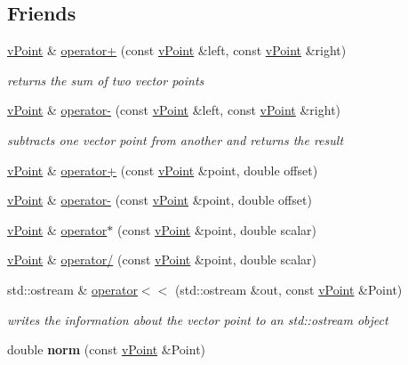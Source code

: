 \subsection*{Friends}
\begin{DoxyCompactItemize}
\item 
\mbox{\label{classv_point_a1c4599f190a262e247ba7c3593b4cfe5}} 
\hyperlink{classv_point}{v\+Point} \& \hyperlink{classv_point_a1c4599f190a262e247ba7c3593b4cfe5}{operator+} (const \hyperlink{classv_point}{v\+Point} \&left, const \hyperlink{classv_point}{v\+Point} \&right)
\begin{DoxyCompactList}\small\item\em returns the sum of two vector points \end{DoxyCompactList}\item 
\mbox{\label{classv_point_ae0fc32c8942991e5183ee6070d749bca}} 
\hyperlink{classv_point}{v\+Point} \& \hyperlink{classv_point_ae0fc32c8942991e5183ee6070d749bca}{operator-\/} (const \hyperlink{classv_point}{v\+Point} \&left, const \hyperlink{classv_point}{v\+Point} \&right)
\begin{DoxyCompactList}\small\item\em subtracts one vector point from another and returns the result \end{DoxyCompactList}\item 
\hyperlink{classv_point}{v\+Point} \& \hyperlink{classv_point_ab409b6cbfb4ba84f7040ddcff0950ea3}{operator+} (const \hyperlink{classv_point}{v\+Point} \&point, double offset)
\item 
\hyperlink{classv_point}{v\+Point} \& \hyperlink{classv_point_a989b20bf1e5537591771480106d3e641}{operator-\/} (const \hyperlink{classv_point}{v\+Point} \&point, double offset)
\item 
\hyperlink{classv_point}{v\+Point} \& \hyperlink{classv_point_a3aab0a4b27ca1c92c3e690bfe7752ddd}{operator$\ast$} (const \hyperlink{classv_point}{v\+Point} \&point, double scalar)
\item 
\hyperlink{classv_point}{v\+Point} \& \hyperlink{classv_point_a71cb80dbf2851ffff4e92b87e38a3aaf}{operator/} (const \hyperlink{classv_point}{v\+Point} \&point, double scalar)
\item 
\mbox{\label{classv_point_a5f06ca068d6617b91698fea5d816250e}} 
std\+::ostream \& \hyperlink{classv_point_a5f06ca068d6617b91698fea5d816250e}{operator$<$$<$} (std\+::ostream \&out, const \hyperlink{classv_point}{v\+Point} \&Point)
\begin{DoxyCompactList}\small\item\em writes the information about the vector point to an std\+::ostream object \end{DoxyCompactList}\item 
\mbox{\label{classv_point_ad65bf05cecb88ac33d7fa105e9ead1a7}} 
double {\bfseries norm} (const \hyperlink{classv_point}{v\+Point} \&Point)
\end{DoxyCompactItemize}


